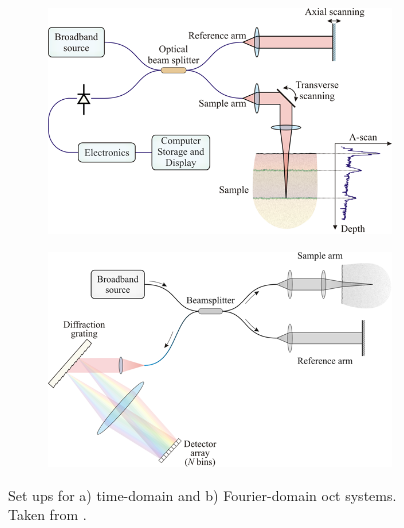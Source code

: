 \begin{figure}
	\centering
    \begin{subfigure}{0.45\textwidth}
    	\centering
        \includegraphics[width=\textwidth]{bground_figs/time_domain}
    \end{subfigure}
    \quad
    \begin{subfigure}{0.45\textwidth}
    	\centering
        \includegraphics[width=\textwidth]{bground_figs/fourier_domain.png}
    \end{subfigure}
	\caption{Set ups for a) time-domain and b) Fourier-domain \ac{oct} systems. Taken from \cite{optical+biomedical_engineering_laboratory_introduction_nodate}.}
    \label{oct_domain}	
\end{figure}

